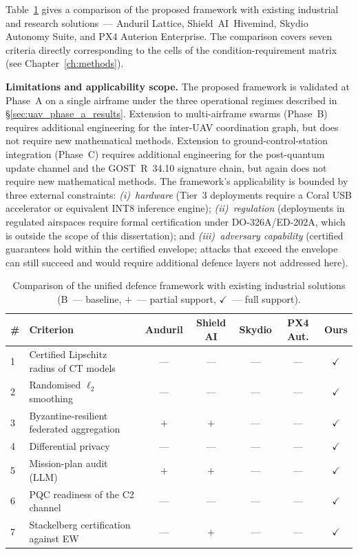 Table~\ref{tab:uav_industry_cmp} gives a comparison of the proposed
framework with existing industrial and research solutions~--- Anduril
Lattice, Shield~AI~Hivemind, Skydio Autonomy Suite, and PX4 Auterion
Enterprise. The comparison covers seven criteria directly
corresponding to the cells of the condition-requirement matrix
(see Chapter~\ref{ch:methods}).

\noindent\textbf{Limitations and applicability scope.} The
proposed framework is validated at Phase~A on a single airframe
under the three operational regimes described in
\S\ref{sec:uav_phase_a_results}. Extension to multi-airframe
swarms (Phase~B) requires additional engineering for the
inter-UAV coordination graph, but does not require new
mathematical methods. Extension to ground-control-station
integration (Phase~C) requires additional engineering for the
post-quantum update channel and the GOST~R~34.10 signature chain,
but again does not require new mathematical methods. The
framework's applicability is bounded by three external
constraints: \emph{(i)~hardware} (Tier~3 deployments require a
Coral USB accelerator or equivalent INT8 inference engine);
\emph{(ii)~regulation} (deployments in regulated airspaces require
formal certification under DO-326A/ED-202A, which is outside the
scope of this dissertation); and \emph{(iii)~adversary capability}
(certified guarantees hold within the certified envelope; attacks
that exceed the envelope can still succeed and would require
additional defence layers not addressed here).

\begin{table}[H]
\centering
\caption{Comparison of the unified defence framework with existing
industrial solutions (B~--- baseline, $+$~--- partial support,
$\checkmark$~--- full support).}
\label{tab:uav_industry_cmp}
\small
\setlength{\tabcolsep}{3pt}
\renewcommand{\arraystretch}{1.15}
\begin{tabularx}{\linewidth}{@{}lXccccc@{}}
\toprule
\# & \textbf{Criterion}
   & \textbf{Anduril} & \textbf{Shield AI} & \textbf{Skydio} & \textbf{PX4 Aut.} & \textbf{Ours}\\
\midrule
1 & Certified Lipschitz radius of CT models       & ---   & ---   & ---   & ---   & $\checkmark$\\
2 & Randomised $\ell_2$ smoothing                  & ---   & ---   & ---   & ---   & $\checkmark$\\
3 & Byzantine-resilient federated aggregation     & $+$   & $+$   & ---   & ---   & $\checkmark$\\
4 & Differential privacy                          & ---   & ---   & ---   & ---   & $\checkmark$\\
5 & Mission-plan audit (LLM)                      & $+$   & $+$   & ---   & ---   & $\checkmark$\\
6 & PQC readiness of the C2 channel               & ---   & ---   & ---   & ---   & $\checkmark$\\
7 & Stackelberg certification against EW          & ---   & $+$   & ---   & ---   & $\checkmark$\\
\bottomrule
\end{tabularx}
\end{table}

